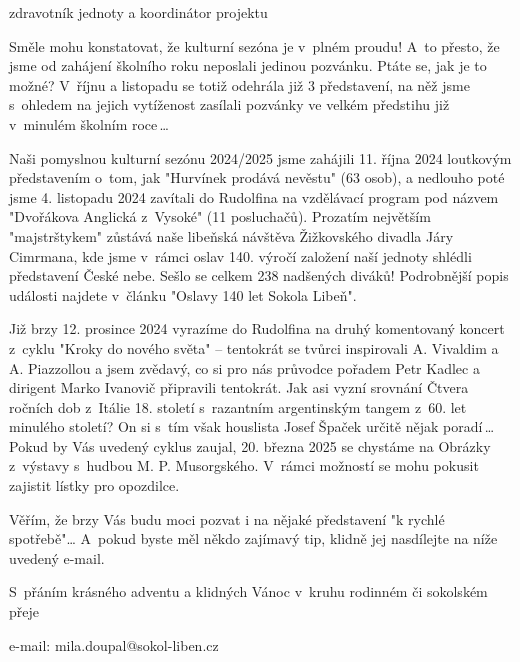 \documentclass[11pt]{article}
\begin{document}
\signature{Vít Jakoubek}{zdravotník jednoty a koordinátor projektu}
\vspace*{24pt}

Směle mohu konstatovat, že kulturní sezóna je v~plném proudu! A~to přesto, že jsme od zahájení školního roku neposlali jedinou pozvánku. Ptáte se, jak je to možné? V~říjnu a listopadu se totiž odehrála již 3 představení, na něž jsme s~ohledem na jejich vytíženost zasílali pozvánky ve velkém předstihu již v~minulém školním roce\,\ldots{}

Naši pomyslnou kulturní sezónu 2024/2025 jsme zahájili 11. října 2024 loutkovým představením o~tom, jak "Hurvínek prodává nevěstu" (63 osob), a nedlouho poté jsme 4. listopadu 2024 zavítali do Rudolfina na vzdělávací program pod názvem "Dvořákova Anglická z~Vysoké" (11 posluchačů).
Prozatím největším "majstrštykem" zůstává naše libeňská návštěva Žižkovského divadla Járy Cimrmana, kde jsme v~rámci oslav 140. výročí založení naší jednoty shlédli představení České nebe. Sešlo se celkem 238 nadšených diváků! Podrobnější popis události najdete v~článku "Oslavy 140 let Sokola Libeň".

Již brzy 12. prosince 2024 vyrazíme do Rudolfina na druhý komentovaný koncert z~cyklu "Kroky do nového světa" – tentokrát se tvůrci inspirovali A. Vivaldim a A. Piazzollou a jsem zvědavý, co si pro nás průvodce pořadem Petr Kadlec a dirigent Marko Ivanovič připravili tentokrát. Jak asi vyzní srovnání Čtvera ročních dob z~Itálie 18. století s~razantním argentinským tangem z~60. let minulého století? On si s~tím však houslista Josef Špaček určitě nějak poradí\,\ldots{}
Pokud by Vás uvedený cyklus zaujal, 20. března 2025 se chystáme na Obrázky z~výstavy s~hudbou M. P. Musorgského. V~rámci možností se mohu pokusit zajistit lístky pro opozdilce.

Věřím, že brzy Vás budu moci pozvat i na nějaké představení "k rychlé spotřebě"\ldots{} A~pokud byste měl někdo zajímavý tip, klidně jej nasdílejte na níže uvedený e-mail.

S~přáním krásného adventu a klidných Vánoc v~kruhu rodinném či sokolském přeje

\signature{Miloslav Doupal}{e-mail: mila.doupal@sokol-liben.cz}
\vspace*{24pt}



\clearpage

\pagestyle{blank}

\vspace*{96pt}
\end{document}

